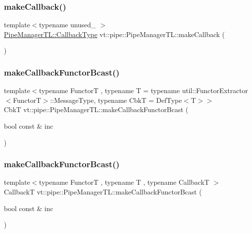 \subsubsection{\texorpdfstring{make\+Callback()}{makeCallback()}}
{\footnotesize\ttfamily template$<$typename unused\+\_\+ $>$ \\
\hyperlink{structvt_1_1pipe_1_1_pipe_manager_t_l_a1cc1d0f1c80a36488f9b5d282e9755d2}{Pipe\+Manager\+T\+L\+::\+Callback\+Type} vt\+::pipe\+::\+Pipe\+Manager\+T\+L\+::make\+Callback (\begin{DoxyParamCaption}{ }\end{DoxyParamCaption})}

\mbox{\label{structvt_1_1pipe_1_1_pipe_manager_t_l_ac5ba44c5897bd1ecfb6f360f5da0a703}} 
\subsubsection{\texorpdfstring{make\+Callback\+Functor\+Bcast()}{makeCallbackFunctorBcast()}\hspace{0.1cm}{\footnotesize\ttfamily [1/2]}}
{\footnotesize\ttfamily template$<$typename FunctorT , typename T  = typename util\+::\+Functor\+Extractor$<$\+Functor\+T$>$\+::\+Message\+Type, typename CbkT  = Def\+Type$<$\+T$>$$>$ \\
CbkT vt\+::pipe\+::\+Pipe\+Manager\+T\+L\+::make\+Callback\+Functor\+Bcast (\begin{DoxyParamCaption}\item[{bool const \&}]{inc }\end{DoxyParamCaption})}

\mbox{\label{structvt_1_1pipe_1_1_pipe_manager_t_l_abb18372fac34782285cdb5d84f4ab449}} 
\subsubsection{\texorpdfstring{make\+Callback\+Functor\+Bcast()}{makeCallbackFunctorBcast()}\hspace{0.1cm}{\footnotesize\ttfamily [2/2]}}
{\footnotesize\ttfamily template$<$typename FunctorT , typename T , typename CallbackT $>$ \\
CallbackT vt\+::pipe\+::\+Pipe\+Manager\+T\+L\+::make\+Callback\+Functor\+Bcast (\begin{DoxyParamCaption}\item[{bool const \&}]{inc }\end{DoxyParamCaption})}

